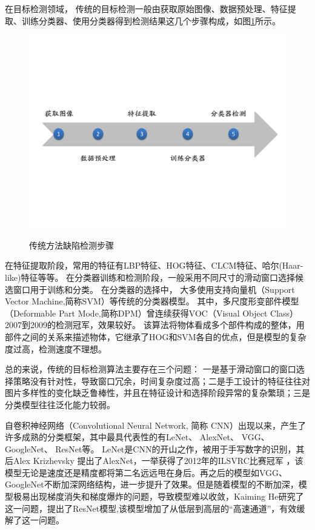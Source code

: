 在目标检测领域，
传统的目标检测一般由获取原始图像、数据预处理、特征提取、训练分类器、使用分类器得到检测结果这几个步骤构成，如图\ref{chuantongjiancebuzhou}所示。
\begin{figure}[htbp]
\centering
\includegraphics[width=1.0\linewidth]{figures/chuantongjiance.pdf}\\
\caption{传统方法缺陷检测步骤}\label{chuantongjiancebuzhou}
\end{figure}
在特征提取阶段，常用的特征有LBP特征、HOG特征、CLCM特征、哈尔\cite{viola2001rapid}(Haar-like)特征等等。
在分类器训练和检测阶段，一般采用不同尺寸的滑动窗口选择候选窗口用于训练和分类。
在分类器的选择中，
大多使用支持向量机\cite{hearst1998support}（Support Vector Machine,简称SVM）等传统的分类器模型。
其中，多尺度形变部件模型\cite{felzenszwalb2010object}（Deformable Part Mode,简称DPM）曾连续获得VOC（Visual Object Class）2007到2009的检测冠军，效果较好。
该算法将物体看成多个部件构成的整体，用部件之间的关系来描述物体，它继承了HOG和SVM各自的优点，但是模型的复杂度过高，检测速度不理想。

总的来说，传统的目标检测算法主要存在三个问题：
一是基于滑动窗口的窗口选择策略没有针对性，导致窗口冗余，时间复杂度过高；二是手工设计的特征往往对图片多样性的变化缺乏鲁棒性，并且在特征设计和选择阶段异常的复杂繁琐；三是分类模型往往泛化能力较弱。

自卷积神经网络\cite{lecun1998gradient}（Convolutional Neural Network, 简称 CNN）出现以来，产生了许多成熟的分类框架，其中最具代表性的有LeNet\cite{lecun1998gradient}、
AlexNet\cite{krizhevsky2012imagenet}、
VGG\cite{simonyan2014very}、
GoogleNet\cite{szegedy2015going}、
ResNet\cite{he2016deep}等。
LeNet是CNN的开山之作，被用于手写数字的识别，其后Alex Krizhevsky 提出了AlexNet，一举获得了2012年的ILSVRC比赛冠军
，该模型无论是速度还是精度都将第二名远远甩在身后。再之后的模型如VGG、GoogleNet不断加深网络结构，进一步提升了效果。但是随着模型的不断加深，模型极易出现梯度消失和梯度爆炸的问题，导致模型难以收敛，Kaiming He研究了这一问题，提出了ResNet模型,该模型增加了从低层到高层的“高速通道”，有效缓解了这一问题。

